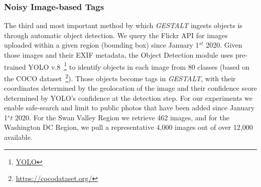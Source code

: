 \subsubsection{Noisy Image-based Tags}
The third and most important method by which \emph{GESTALT} ingests objects is through automatic object detection.
We query the Flickr API for images uploaded within a given region (bounding box) since January 1$^{st}$ 2020. 
Given those images and their EXIF metadata, the Object Detection module uses pre-trained YOLO v.8~\footnote{\href{https://github.com/ultralytics/ultralytics}{YOLO}} to identify objects in each image from 80 classes (based on the COCO dataset~\footnote{\href{{https://cocodataset.org/}}{https://cocodataset.org/}}). 
Those objects become tags in \emph{GESTALT}, with their coordinates determined by the geolocation of the image and their confidence score determined by YOLO's confidence at the detection step.
For our experiments we enable safe-search and limit to public photos that have been added since January 1$^st$ 2020. For the Swan Valley Region we retrieve 462 images, and for the Washington DC Region, we pull a representative 4,000 images out of over 12,000 available. 








